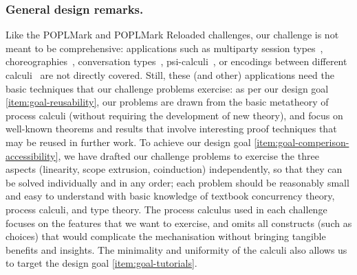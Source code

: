 \documentclass[runningheads]{llncs}
\begin{document}
\subsubsection{General design remarks.}
Like the POPLMark and POPLMark Reloaded challenges, our challenge is not meant to be comprehensive:
applications such as multiparty session types~\cite{10.1145/2827695,10.1145/3290343}, choreographies~\cite{DBLP:journals/jar/CruzFilipeMP23}, conversation types~\cite{DBLP:journals/tcs/CairesV10}, psi-calculi~\cite{lmcs:696}, or encodings between different calculi~\cite{DBLP:journals/iandc/Gorla10,DBLP:conf/forte/CairesP16,DBLP:journals/iandc/DardhaGS17,DBLP:conf/ecoop/ScalasDHY17,DBLP:journals/iandc/KouzapasPY19,10.1145/3479394.3479407} are not directly covered.  Still, these (and other) applications need the basic techniques that our challenge problems exercise:
as per our design goal \ref{item:goal-reusability},
our problems are drawn from the basic metatheory of process calculi (without requiring the development of new theory), and focus on well-known theorems
and results that involve interesting proof techniques that may be reused in further work.
To achieve our design goal \ref{item:goal-comperison-accessibility},
we have drafted our challenge problems to exercise the three aspects (linearity, scope extrusion, coinduction) independently, so that they can be solved individually and in any order;
each problem should be reasonably small and easy to understand with basic knowledge of textbook concurrency theory, process calculi, and type theory.  The process calculus used in each challenge
focuses on the features that we want to exercise, and omits all constructs
(such as choices) that would complicate the mechanisation without bringing tangible
benefits and insights.
The minimality and uniformity of the calculi also allows us to target the design
goal \ref{item:goal-tutorials}.


\end{document}
